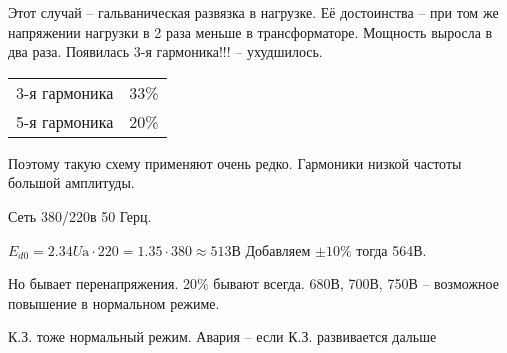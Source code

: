 Этот случай -- гальваническая развязка в нагрузке. Её достоинства -- при том же напряжении нагрузки в 2 раза меньше в трансформаторе. Мощность выросла в два раза. Появилась 3-я гармоника!!! -- ухудшилось.

\begin{tabular}{cc}
	3-я гармоника & 33\%\\
	5-я гармоника & 20\%\\
\end{tabular}

Поэтому такую схему применяют очень редко. Гармоники низкой частоты большой амплитуды.

Сеть 380/220в 50 Герц.

$E_{d0} = 2.34U\text{a}\cdot220 = 1.35\cdot 380 \approx 513В$
Добавляем $\pm 10\%$ тогда 564В.

Но бывает перенапряжения. 20\% бывают всегда. 680В, 700В, 750В -- возможное повышение в нормальном режиме.

К.З. тоже нормальный режим. Авария -- если К.З. развивается дальше


